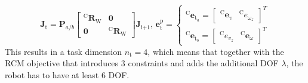 \begin{equation}
    \mathbf{J}_\text{t} = \mathbf{P}_{a/b} \begin{bmatrix}^\text{C}\mathbf{R}_\text{W} & \mathbf{0} \\ \mathbf{0} & ^\text{C}\mathbf{R}_\text{W}\end{bmatrix}\mathbf{J}_\text{i+1},\,
    \mathbf{e}^\text{p}_\text{t} = 
    \begin{cases}
        ^\text{C}\mathbf{e}_{\text{t}_a}=\begin{bmatrix}^\text{C}\mathbf{e}_v & ^\text{C}e_{\omega_z} \end{bmatrix}^T \\
        ^\text{C}\mathbf{e}_{\text{t}_b}=\begin{bmatrix}^\text{C}e_{v_z} & ^\text{C}\mathbf{e}_{\omega} \end{bmatrix}^T
    \end{cases}
\end{equation}
This results in a task dimension $n_\text{t} = 4$, which means that together with the RCM objective that introduces 3 constraints and adds the additional DOF $\lambda$, the robot has to have at least 6 DOF.

